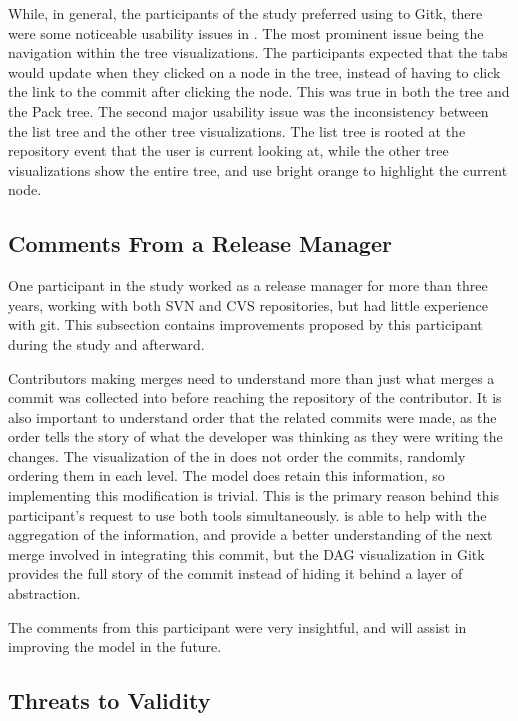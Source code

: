 While, in general, the participants of the study preferred using \tool
to Gitk, there were some noticeable usability issues in \tool. The most
prominent issue being the navigation within the tree visualizations. The
participants expected that the tabs would update when they clicked on a
node in the tree, instead of having to click the link to the commit
after clicking the node. This was true in both the \rt tree and the Pack
tree. The second major usability issue was the inconsistency between the
list tree and the other tree visualizations. The list tree is rooted at
the repository event that the user is current looking at, while the
other tree visualizations show the entire tree, and use bright orange to
highlight the current node.


\subsection{Comments From a Release Manager}
\label{sub:comments_from_a_release_manager}

One participant in the study worked as a release manager for more than
three years, working with both SVN and CVS repositories, but had little
experience with git. This subsection contains improvements proposed by
this participant during the study and afterward.

Contributors making merges need to understand more than just what merges
a commit was collected into before reaching the repository of the
contributor. It is also important to understand order that the related
commits were made, as the order tells the story of what the developer
was thinking as they were writing the changes. The visualization of the
\mt in \tool does not order the commits, randomly ordering them in each
level. The \mt model does retain this information, so implementing this
modification is trivial. This is the primary reason behind this
participant's request to use both tools simultaneously. \tool is able to
help with the aggregation of the information, and provide a better
understanding of the next merge involved in integrating this commit, but
the DAG visualization in Gitk provides the full story of the commit
instead of hiding it behind a layer of abstraction.

The comments from this participant were very insightful, and will assist
in improving the model in the future.

\subsection{Threats to Validity}
\label{sub:threats}

